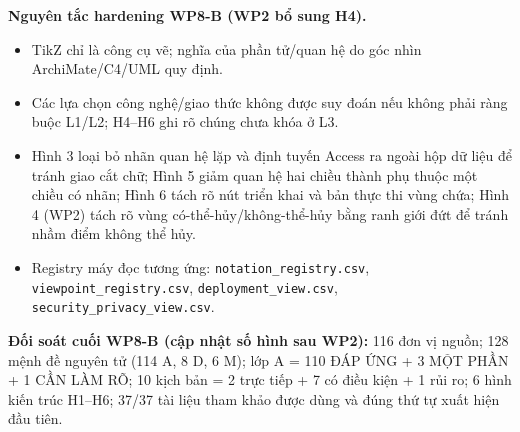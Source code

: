 \documentclass[10pt]{article}
\begin{document}
\vspace{10pt}
\textbf{Nguyên tắc hardening WP8-B (WP2 bổ sung H4).}
\begin{itemize}[leftmargin=1.5em,itemsep=2pt]
\item TikZ chỉ là công cụ vẽ; nghĩa của phần tử/quan hệ do góc nhìn ArchiMate/C4/UML quy định.
\item Các lựa chọn công nghệ/giao thức không được suy đoán nếu không phải ràng buộc L1/L2; H4--H6 ghi rõ chúng chưa khóa ở L3.
\item Hình 3 loại bỏ nhãn quan hệ lặp và định tuyến Access ra ngoài hộp dữ liệu để tránh giao cắt chữ; Hình 5 giảm quan hệ hai chiều thành phụ thuộc một chiều có nhãn; Hình 6 tách rõ nút triển khai và bản thực thi vùng chứa; Hình 4 (WP2) tách rõ vùng có-thể-hủy/không-thể-hủy bằng ranh giới đứt để tránh nhầm điểm không thể hủy.
\item Registry máy đọc tương ứng: \texttt{notation\_registry.csv}, \texttt{viewpoint\_registry.csv}, \texttt{deployment\_view.csv}, \texttt{security\_privacy\_view.csv}.
\end{itemize}

\vfill
\textbf{Đối soát cuối WP8-B (cập nhật số hình sau WP2):} 116 đơn vị nguồn; 128 mệnh đề nguyên tử (114 A, 8 D, 6 M); lớp A = 110 ĐÁP ỨNG + 3 MỘT PHẦN + 1 CẦN LÀM RÕ; 10 kịch bản = 2 trực tiếp + 7 có điều kiện + 1 rủi ro; 6 hình kiến trúc H1--H6; 37/37 tài liệu tham khảo được dùng và đúng thứ tự xuất hiện đầu tiên.
\end{document}
